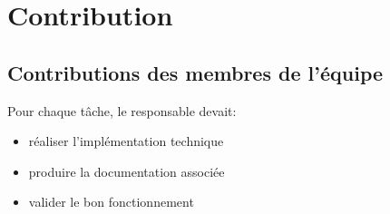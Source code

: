 \section{Contribution}

\subsection{Contributions des membres de l'équipe}
Pour chaque tâche, le responsable devait:
\begin{itemize}
    \item réaliser l'implémentation technique
    \item produire la documentation associée
    \item valider le bon fonctionnement
\end{itemize}

